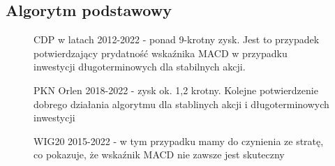 \documentclass{article}
\begin{document}
    \subsection{Algorytm podstawowy}
    \begin{figure}[H]
        \noindent{}
        \caption{CDP w latach 2012-2022 - ponad 9-krotny zysk. Jest to przypadek potwierdzający
        prydatność wskaźnika MACD w przypadku inwestycji długoterminowych dla stabilnych akcji.}
    \end{figure}
    \begin{figure}[H]
        \noindent{}
        \caption{PKN Orlen 2018-2022 - zysk ok. 1,2 krotny. Kolejne potwierdzenie dobrego działania algorytmu dla stablinych akcji i długoterminowych inwestycji}
    \end{figure}
    \begin{figure}[H]
        \noindent{}
        \caption{WIG20 2015-2022 - w tym przypadku mamy do czynienia ze stratę, co pokazuje, że wskaźnik MACD nie zawsze jest skuteczny}
    \end{figure}
\end{document}
